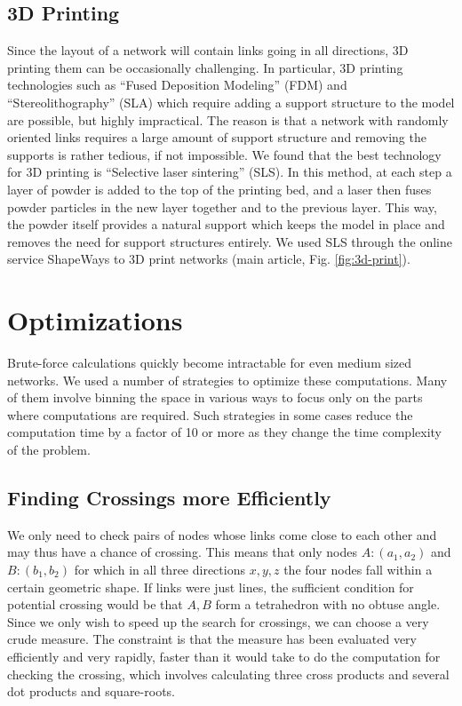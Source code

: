 \documentclass[endfloats,nofootinbib,preprint,floatfix,titlepage,superscriptaddress,linenumbers]{revtex4-1} %
\begin{document}
\subsection{3D Printing}
Since the layout of a network will contain links going in all directions, 3D printing them can be occasionally challenging. 
In particular, 3D printing technologies such as ``Fused Deposition Modeling'' (FDM) and ``Stereolithography'' (SLA) which require adding a support structure to the model are possible, but highly impractical. 
The reason is that a network with randomly oriented links requires a large amount of support structure and removing the supports is rather tedious, if not impossible. 
We found that the best technology for 3D printing is ``Selective laser sintering'' (SLS). 
In this method, at each step a layer of powder is added to the top of the printing bed, and a laser then fuses powder particles in the new layer together and to the previous layer. 
This way, the powder itself provides a natural support which keeps the model in place and removes the need for support structures entirely.
We used SLS through the online service ShapeWays to 3D print networks (main article, Fig. \ref{fig:3d-print}). 

\section{Optimizations\label{ap:optimizations}}
Brute-force calculations quickly become intractable for even medium sized networks. We used a number of strategies to optimize these computations. Many of them involve binning the space in various ways to focus only on the parts where computations are required. Such strategies in some cases reduce the computation time by a factor of 10 or more as they change the time complexity of the problem. 

\subsection{Finding Crossings more Efficiently}
We only need to check pairs of nodes whose links come close to each other and may thus have a chance of crossing. 
This means that only nodes $A:(a_1,a_2)$ and $B:(b_1,b_2)$ for which in all three  directions $x,y,z$ the four nodes fall within a certain geometric shape. 
If links were just lines, the sufficient condition for potential crossing would be that $A,B$ form a tetrahedron with no obtuse angle. 
Since we only wish to speed up the search for crossings, we can choose a very crude measure. 
The constraint is that the measure has been evaluated very efficiently and very rapidly, faster than it would take to do the computation for checking the crossing, which involves calculating three cross products and several dot products and square-roots. 
\end{document}
